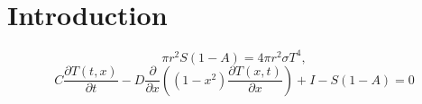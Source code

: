 \documentclass[12pt, onecolumn]{revtex4-2}    %
\newcommand{\partialderiv}[2]{\frac{\partial {#1}}{\partial {#2}}}
\begin{document}
\section{Introduction} \label{sec:Introduction}
\cite{RN21}
\cite{SAB22}
\cite{LA2010}
\cite{Fogg92}
\begin{equation}
  \pi r^2 S(1-A) = 4 \pi r^2 \sigma T^4, \label{eq:0DEBCM}
\end{equation}
\begin{equation}
  C \partialderiv{T(t, x)}{t} - D \partialderiv{}{x} \left((1-x^2)\partialderiv{T(x, t)}{x}\right) + I - S(1-A) = 0
  \label{eq:PDE_in_x}
\end{equation}
\cite{WK97}
\cite{SMS08}
\cite{Roe06}
\end{document}
